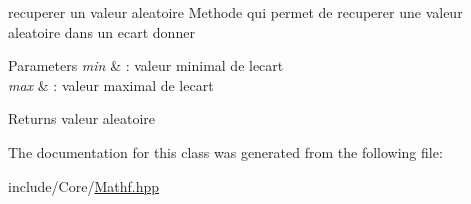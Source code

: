 recuperer un valeur aleatoire Methode qui permet de recuperer une valeur aleatoire dans un ecart donner 


\begin{DoxyParams}{Parameters}
{\em min} & \+: valeur minimal de l\textquotesingle{}ecart \\
\hline
{\em max} & \+: valeur maximal de l\textquotesingle{}ecart \\
\hline
\end{DoxyParams}
\begin{DoxyReturn}{Returns}
valeur aleatoire 
\end{DoxyReturn}


The documentation for this class was generated from the following file\+:\begin{DoxyCompactItemize}
\item 
include/\+Core/\mbox{\hyperlink{_mathf_8hpp}{Mathf.\+hpp}}\end{DoxyCompactItemize}
